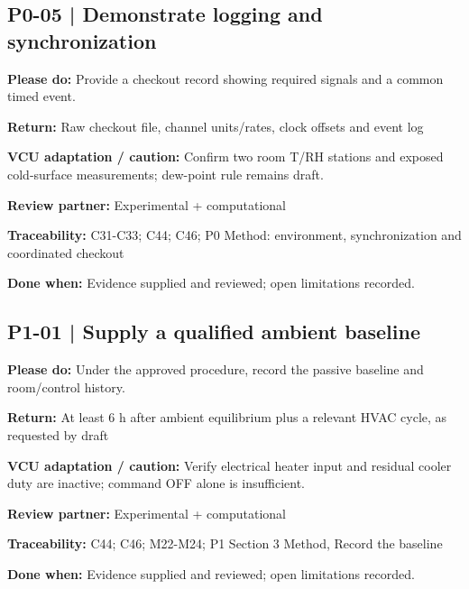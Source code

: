 \documentclass[11pt]{article}
\begin{document}
\par\noindent\begin{minipage}{\textwidth}\small\setlength{\parskip}{2pt}
\subsection*{P0-05 | Demonstrate logging and synchronization}
\textbf{Please do:} Provide a checkout record showing required signals and a common timed event.\par
\textbf{Return:} Raw checkout file, channel units/rates, clock offsets and event log\par
\textbf{VCU adaptation / caution:} Confirm two room T/RH stations and exposed cold-surface measurements; dew-point rule remains draft.\par
\textbf{Review partner:} Experimental + computational\par
\textbf{Traceability:} C31-C33; C44; C46; P0 Method: environment, synchronization and coordinated checkout\par
\textbf{Done when:} Evidence supplied and reviewed; open limitations recorded.\par
\end{minipage}\par\vspace{8pt}
\par\noindent\begin{minipage}{\textwidth}\small\setlength{\parskip}{2pt}
\subsection*{P1-01 | Supply a qualified ambient baseline}
\textbf{Please do:} Under the approved procedure, record the passive baseline and room/control history.\par
\textbf{Return:} At least 6 h after ambient equilibrium plus a relevant HVAC cycle, as requested by draft\par
\textbf{VCU adaptation / caution:} Verify electrical heater input and residual cooler duty are inactive; command OFF alone is insufficient.\par
\textbf{Review partner:} Experimental + computational\par
\textbf{Traceability:} C44; C46; M22-M24; P1 Section 3 Method, Record the baseline\par
\textbf{Done when:} Evidence supplied and reviewed; open limitations recorded.\par
\end{minipage}\par\vspace{8pt}
\end{document}
